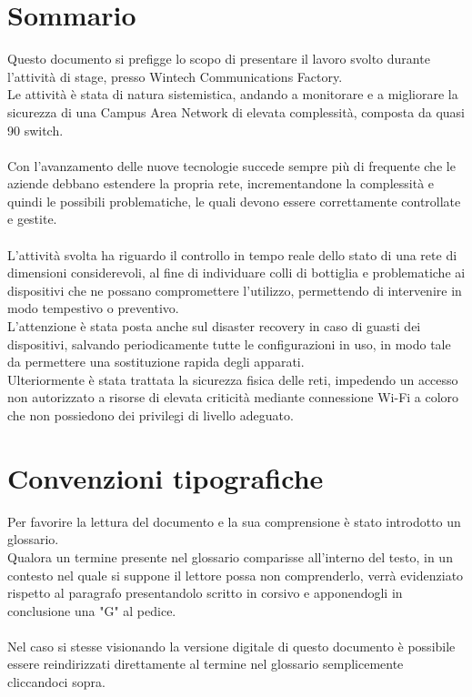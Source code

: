\documentclass[Tesi.tex]{subfiles}
\begin{document}
\clearpage\thispagestyle{empty}
	
\renewcommand{\chaptername}{}
\renewcommand{\thechapter}{}
\chapter{Sommario}
Questo documento si prefigge lo scopo di presentare il lavoro svolto durante l'attività di stage, presso Wintech Communications Factory. \\
Le attività è stata di natura sistemistica, andando a monitorare e a migliorare la sicurezza di una Campus Area Network di elevata complessità, composta da quasi 90 switch. \\\\

Con l'avanzamento delle nuove tecnologie succede sempre più di frequente che le aziende debbano estendere la propria rete, incrementandone la complessità e quindi le possibili problematiche, le quali devono essere correttamente controllate e gestite. \\\\
L'attività svolta ha riguardo il controllo in tempo reale dello stato di una rete di dimensioni considerevoli, al fine di individuare colli di bottiglia e problematiche ai dispositivi che ne possano compromettere l'utilizzo, permettendo di intervenire in modo tempestivo o preventivo.\\
L'attenzione è stata posta anche sul disaster recovery in caso di guasti dei dispositivi, salvando periodicamente tutte le configurazioni in uso, in modo tale da permettere una sostituzione rapida degli apparati. \\
Ulteriormente è stata trattata la sicurezza fisica delle reti, impedendo un accesso non autorizzato a risorse di elevata criticità mediante connessione Wi-Fi a coloro che non possiedono dei privilegi di livello adeguato. \\


\newpage
\chapter{Convenzioni tipografiche}
Per favorire la lettura del documento e la sua comprensione è stato introdotto un glossario. \\
Qualora un termine presente nel glossario comparisse all'interno del testo, in un contesto nel quale si suppone il lettore possa non comprenderlo, verrà evidenziato rispetto al paragrafo presentandolo scritto in corsivo e apponendogli in conclusione una "G" al pedice. \\\\
Nel caso si stesse visionando la versione digitale di questo documento è possibile essere reindirizzati direttamente al termine nel glossario semplicemente cliccandoci sopra. \\


\clearpage
\end{document}
